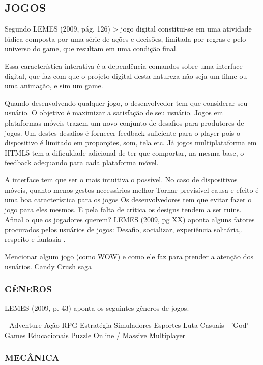 \documentclass[11pt,a4paper]{article}
\begin{document}
\subsection{JOGOS}
Segundo LEMES (2009, pág. 126) > jogo digital constitui-se em uma
atividade lúdica composta por uma série de ações e decisões,
limitada por regras e pelo universo do game, que resultam em uma
condição final.

Essa característica interativa é a dependência comandos
sobre uma interface digital, que faz com que o projeto digital desta
natureza não seja um filme ou uma animação, e sim um game.

Quando desenvolvendo qualquer jogo, o desenvolvedor tem que considerar
seu usuário. O objetivo é maximizar a satisfação de seu usuário.
Jogos em plataformas móveis trazem um novo conjunto de desafios para
produtores de jogos. Um destes desafios é fornecer feedback suficiente
para o player pois o dispositivo é limitado em proporções, som, tela
etc. Já jogos multiplataforma em HTML5 tem a dificuldade adicional
de ter que comportar, na mesma base, o feedback adequando para cada
plataforma móvel.

A interface tem que ser o mais intuitiva o possível. No caso de       
dispositivos móveis, quanto menos gestos necessários melhor Tornar   
previsível causa e efeito é uma boa característica para os jogos    
Os desenvolvedores tem que evitar fazer o jogo para eles mesmos. E     
pela falta de crítica os designs tendem a ser ruins. Afinal o que os  
jogadores querem? LEMES (2009, pg XX) aponta alguns fatores procurados
pelos usuários de jogos: Desafio, socializar, experiência solitária,.
respeito e fantasia                                                    .

Mencionar algum jogo (como WOW) e como ele faz para prender a
atenção dos usuários. Candy Crush saga 

\subsubsection{GÊNEROS}

LEMES (2009, p. 43) aponta os seguintes gêneros de jogos.

- Adventure Ação RPG Estratégia Simuladores Esportes Luta Casuais
- 'God' Games Educacionais Puzzle Online / Massive Multiplayer

\subsubsection{MECÂNICA}
\end{document}
